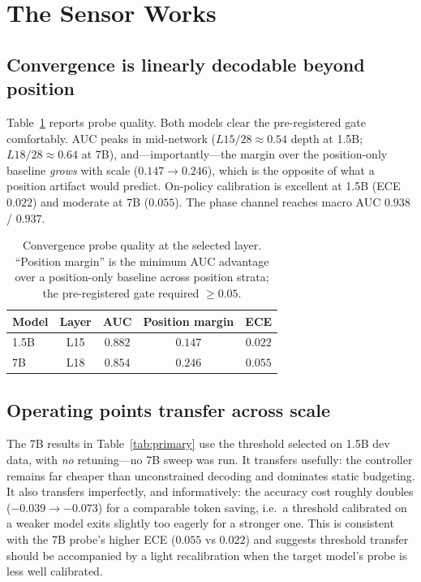 \section{The Sensor Works}
\label{sec:sensor}

\subsection{Convergence is linearly decodable beyond position}
\label{sec:probes}

Table~\ref{tab:probes} reports probe quality. Both models clear the
pre-registered gate comfortably. AUC peaks in mid-network ($L15/28 \approx
0.54$ depth at 1.5B; $L18/28 \approx 0.64$ at 7B), and---importantly---the
margin over the position-only baseline \emph{grows} with scale ($0.147
\rightarrow 0.246$), which is the opposite of what a position artifact would
predict. On-policy calibration is excellent at 1.5B (ECE $0.022$) and moderate
at 7B ($0.055$). The phase channel reaches macro AUC $0.938$ / $0.937$.

\begin{table}[t]
\centering
\small
\begin{tabular}{lcccc}
\toprule
Model & Layer & AUC & Position margin & ECE \\
\midrule
1.5B & L15 & $0.882$ & $0.147$ & $0.022$ \\
7B   & L18 & $0.854$ & $0.246$ & $0.055$ \\
\bottomrule
\end{tabular}
\caption{Convergence probe quality at the selected layer. ``Position margin''
is the minimum AUC advantage over a position-only baseline across position
strata; the pre-registered gate required $\ge 0.05$.}
\label{tab:probes}
\end{table}

\subsection{Operating points transfer across scale}
\label{sec:transfer}

The 7B results in Table~\ref{tab:primary} use the threshold selected on 1.5B
dev data, with \emph{no} retuning---no 7B sweep was run. It transfers usefully:
the controller remains far cheaper than unconstrained decoding and dominates
static budgeting. It also transfers imperfectly, and informatively: the
accuracy cost roughly doubles ($-0.039 \rightarrow -0.073$) for a comparable
token saving, i.e.\ a threshold calibrated on a weaker model exits slightly too
eagerly for a stronger one. This is consistent with the 7B probe's higher ECE
($0.055$ vs $0.022$) and suggests threshold transfer should be accompanied by
a light recalibration when the target model's probe is less well calibrated.

